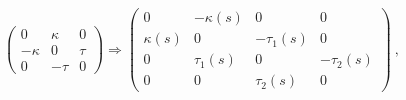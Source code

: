 \begin{equation}
\left(\begin{array}{ccc}
 0 & \kappa & 0 \\
-\kappa & 0 & \tau\\
0 & -\tau & 0\end{array} \right )\Longrightarrow
\left(\begin{array}{cccc}
 0 & -\kappa (s)& 0 & 0\\
\kappa (s)& 0 & -\tau _1 (s)& 0\\
0 & \tau _1(s) & 0 & -\tau _2(s)\\
0 & 0 & \tau _ 2(s) & 0 \end{array} \right )~,
\end{equation}

